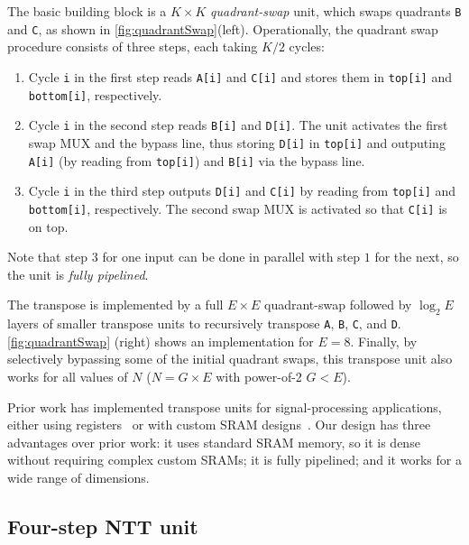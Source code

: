 The basic building block is a $K \times K$ \textit{quadrant-swap} unit, which swaps quadrants \texttt{B} and \texttt{C}, as shown in \autoref{fig:quadrantSwap}(left). Operationally, the quadrant swap procedure consists of three steps, each taking $K/2$ cycles:
\begin{enumerate}
  \item Cycle \texttt{i} in the first step reads \texttt{A[i]} and \texttt{C[i]} and stores them in \texttt{top[i]} and \texttt{bottom[i]}, respectively.
\item Cycle \texttt{i} in the second step reads \texttt{B[i]} and \texttt{D[i]}. The unit activates the first swap MUX and the bypass line, thus storing \texttt{D[i]} in \texttt{top[i]} and outputing \texttt{A[i]} (by reading from \texttt{top[i]}) and \texttt{B[i]} via the bypass line.
\item Cycle \texttt{i} in the third step outputs \texttt{D[i]} and \texttt{C[i]} by reading from \texttt{top[i]} and \texttt{bottom[i]}, respectively. The second swap MUX is activated so that \texttt{C[i]} is on top.
\end{enumerate}
Note that step $3$ for one input can be done in parallel with step $1$ for the next, so the unit is \emph{fully pipelined}.

The transpose is implemented by a full $E \times E$ quadrant-swap followed by $\log_2E$ layers of smaller transpose units
to recursively transpose \texttt{A}, \texttt{B}, \texttt{C}, and \texttt{D}. \autoref{fig:quadrantSwap} (right) shows an implementation for $E=8$. Finally, by selectively bypassing some of the initial quadrant swaps,
this transpose unit also works for all values of $N$ ($N=G\times E$ with power-of-2 $G < E$).

Prior work has implemented transpose units for signal-processing applications,
either using registers~\cite{wang2018pipelined,zhang2020novel} or with custom SRAM designs~\cite{shang2014single}.
Our design has three advantages over prior work: it uses standard SRAM memory,
so it is dense without requiring complex custom SRAMs;
it is fully pipelined; and it works for a wide range of dimensions.

\subsection{Four-step NTT unit}\label{sec:fourStepNTT}




